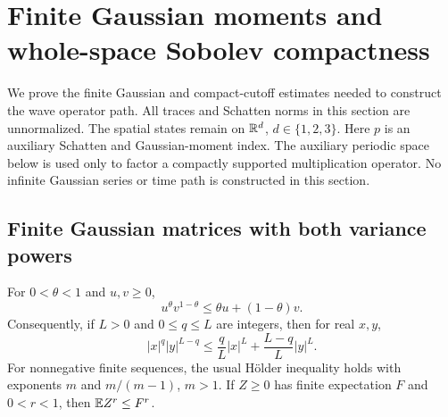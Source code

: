 \section{Finite Gaussian moments and whole-space Sobolev compactness}
\label{S:compact-gaussian}

We prove the finite Gaussian and compact-cutoff estimates needed to construct
the wave operator path. All traces and Schatten norms in this section are
unnormalized. The spatial states remain on $\mathbb{R}^d$, $d \in \{1,2,3\}$. Here $p$
is an auxiliary Schatten and Gaussian-moment index. The auxiliary periodic space
below is used only to factor a compactly supported multiplication operator. No
infinite Gaussian series or time path is constructed in this section.

\subsection{Finite Gaussian matrices with both variance powers}

\begin{lemma}\label{L:gaussian-scalar-powers}
  For $0 < \theta < 1$ and $u,v \ge 0$,
  \begin{equation}\label{E:gaussian-weighted-power}
    u^\theta v^{1-\theta} \le \theta u+(1-\theta)v.
  \end{equation}
  Consequently, if $L > 0$ and $0 \le q \le L$ are integers, then for real
  $x,y$,
  \begin{equation}\label{E:gaussian-integer-power}
    |x|^q|y|^{L-q}
    \le \frac qL|x|^L+\frac{L-q}L|y|^L.
  \end{equation}
  For nonnegative finite sequences, the usual H\"older inequality holds with
  exponents $m$ and $m/(m-1)$, $m > 1$. If $Z \ge 0$ has finite expectation $F$
  and $0 < r < 1$, then $\mathbb{E} Z^r \le F^r$.
\end{lemma}

